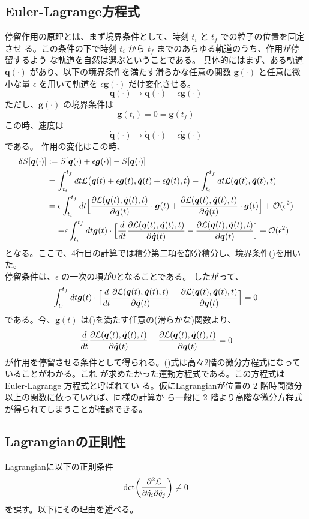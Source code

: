 \documentclass[a4paper,11pt]{ltjsarticle}
\newcommand{\qv}{\bm{q}}
\newcommand{\La}{\mathcal{L}}
\newcommand{\Laq}{\mathcal{L}(\qv(t),\dot{\qv}(t),t)}
\newcommand{\intS}{\int_{t_i}^{t_f}dt}
\newcommand{\ELeq}{\frac{d}{dt}\pdv{\Laq}{\dot{\qv}(t)}-\pdv{\Laq}{\qv(t)}}
\begin{document}
\subsection{Euler-Lagrange方程式}
\label{sec:Henbun}
停留作用の原理とは、まず境界条件として、時刻 $t_i$ と $t_f$ での粒子の位置を固定させ
る。この条件の下で時刻 $t_i$ から $t_f$ までのあらゆる軌道のうち、作用が停留するよう
な軌道を自然は選ぶということである。
具体的にはまず、ある軌道 $\qv(\cdot)$ があり、以下の境界条件を満たす滑らかな任意の関数 $\bm{g}(\cdot)$ と任意に微小な量 $\epsilon$ を用いて軌道を $\epsilon \bm{g}(\cdot)$ だけ変化させる。
\[
\qv(\cdot) \rightarrow \qv(\cdot)+\epsilon \bm{g}(\cdot)
\]
ただし、$\bm{g}(\cdot)$ の境界条件は
\begin{equation}
\bm{g}(t_i)=0=\bm{g}(t_f)
\label{eq:boundry}
\end{equation}
この時、速度は
\[
\dot{\qv}(\cdot) \rightarrow \dot{\qv}(\cdot)+\epsilon\dot{\bm{g}}(\cdot)
\]
である。
作用の変化はこの時、
\begin{align*}
\delta S[\qv(\cdot)]&:=S[\qv(\cdot)+\epsilon\bm{g}(\cdot)]-S[\qv(\cdot)]
\\&=\intS\La\bigl(\qv(t)+\epsilon\bm{g}(t),\dot{\qv}(t)+\epsilon\dot{\bm{g}}(t),t\bigr)-\intS\Laq
\\&=\epsilon\intS\Bigl[\pdv{\Laq}{\qv(t)}\cdot\bm{g}(t)+\pdv{\Laq}{\dot{\qv}(t)}\cdot\dot{\bm{g}}(t)\Bigr]+\mathcal{O}(\epsilon^2)
\\&=-\epsilon\intS\bm{g}(t)\cdot\Bigl[\ELeq\Bigr]+\mathcal{O}(\epsilon^2)
\end{align*}
となる。ここで、4行目の計算では積分第二項を部分積分し、境界条件()を用いた。
\\停留条件は、$\epsilon$ の一次の項が0となることである。
したがって、
\[
\intS\bm{g}(t)\cdot\Bigl[\ELeq\Bigr]=0
\]
である。今、$\bm{g}(t)$ は()を満たす任意の(滑らかな)関数より、
\begin{equation}
\ELeq=0
\label{eq:ELeq}
\end{equation}
が作用を停留させる条件として得られる。()式は高々2階の微分方程式になっていることがわかる。これ
が求めたかった運動方程式である。この方程式は Euler-Lagrange 方程式と呼ばれてい
る。仮にLagrangianが位置の 2 階時間微分以上の関数に依っていれば、同様の計算か
ら一般に 2 階より高階な微分方程式が得られてしまうことが確認できる。

\subsection{Lagrangianの正則性}
\label{sec:Seisoku}
Lagrangianに以下の正則条件
\[
\det(\pdv{\La}{\dot{q}_i}{\dot{q}_j})\ne0
\]
を課す。以下にその理由を述べる。
\end{document}

